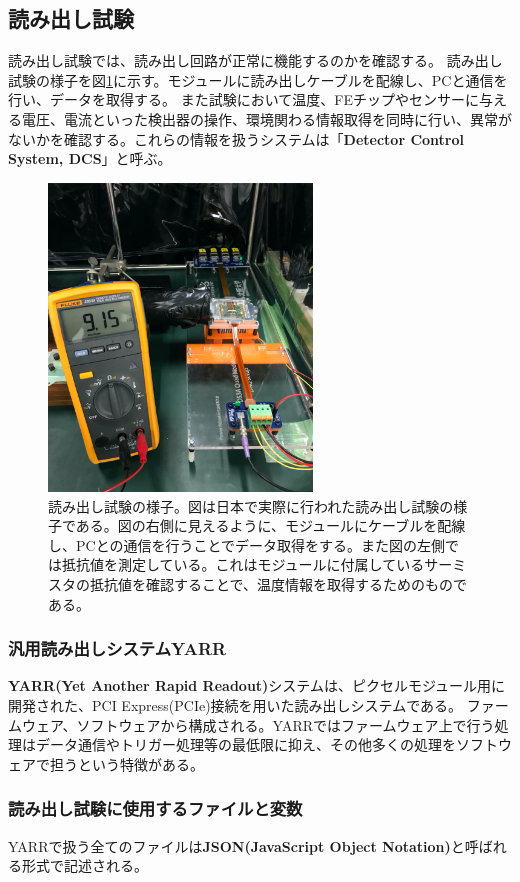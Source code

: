\clearpage
\subsection{読み出し試験}
読み出し試験では、読み出し回路が正常に機能するのかを確認する。
読み出し試験の様子を図\ref{readout_overview}に示す。モジュールに読み出しケーブルを配線し、PCと通信を行い、データを取得する。
また試験において温度、FEチップやセンサーに与える電圧、電流といった検出器の操作、環境関わる情報取得を同時に行い、異常がないかを確認する。これらの情報を扱うシステムは「\textbf{Detector Control System, DCS}」と呼ぶ。

\begin{figure}[bpt]\centering
\includegraphics[width=7cm]{./readout_overview.png}
\caption[読み出し試験の様子]{読み出し試験の様子。図は日本で実際に行われた読み出し試験の様子である。図の右側に見えるように、モジュールにケーブルを配線し、PCとの通信を行うことでデータ取得をする。また図の左側では抵抗値を測定している。これはモジュールに付属しているサーミスタの抵抗値を確認することで、温度情報を取得するためのものである。}
\label{readout_overview}
\end{figure}

\subsubsection{汎用読み出しシステムYARR}
\textbf{YARR(Yet Another Rapid Readout)}システム\cite{3-3}は、ピクセルモジュール用に開発された、PCI Express(PCIe)接続を用いた読み出しシステムである。
ファームウェア、ソフトウェアから構成される。YARRではファームウェア上で行う処理はデータ通信やトリガー処理等の最低限に抑え、その他多くの処理をソフトウェアで担うという特徴がある。

\clearpage
\subsubsection{読み出し試験に使用するファイルと変数}
YARRで扱う全てのファイルは\textbf{JSON(JavaScript Object Notation)}と呼ばれる形式で記述される。

